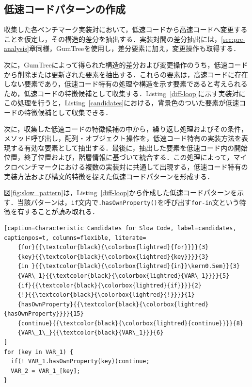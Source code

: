 \documentclass[submit,techrep,noauthor]{ipsj}
\begin{document}
\subsection{低速コードパターンの作成}
収集した各ベンチマーク実装対において，低速コードから高速コードへ変更することを仮定し，その構造的差分を抽出する．実装対間の差分抽出には，\ref{sec:pre-analysis}章同様，GumTreeを使用し，差分要素に加え，変更操作も取得する．

次に，GumTreeによって得られた構造的差分および変更操作のうち，低速コードから削除または更新された要素を抽出する．これらの要素は，高速コードに存在しない要素であり，低速コード特有の処理や構造を示す要素であると考えられるため，低速コードの特徴候補として収集する．Listing~\ref{diff-loop}に示す実装対にこの処理を行うと，Listing~\ref{candidates}における，背景色のついた要素が低速コードの特徴候補として収集できる．

次に，収集した低速コードの特徴候補の中から，繰り返し処理およびその条件，メソッド呼び出し，配列・オブジェクト操作を，低速コード特有の実装方法を表現する有効な要素として抽出する．最後に，抽出した要素を低速コード内の開始位置，終了位置および，階層情報に基づいて統合する．この処理によって，マイクロベンチマークにおける複数の実装対に共通して出現する，低速コード特有の実装方法および構文的特徴を捉えた低速コードパターンを形成する．

図\ref{fig:slow_pattern}は，Listing~\ref{diff-loop}から作成した低速コードパターンを示す．当該パターンは，\texttt{if}文内で\texttt{.hasOwnProperty()}を呼び出す\texttt{for-in}文という特徴を有することが読み取れる．

\begin{lstlisting}[caption=Characteristic Candidates for Slow Code, label=candidates, captionpos=t, columns=flexible, literate=
    {for}{{\textcolor{black}{\colorbox{lightred}{for}}}}{3}
    {key}{{\textcolor{black}{\colorbox{lightred}{key}}}}{3}
    {in }{{\textcolor{black}{\colorbox{lightred}{in}}\kern0.5em}}{3}
    {VAR\_1}{{\textcolor{black}{\colorbox{lightred}{VAR\_1}}}}{5}
    {if}{{\textcolor{black}{\colorbox{lightred}{if}}}}{2}
    {!}{{\textcolor{black}{\colorbox{lightred}{!}}}}{1}
    {hasOwnProperty}{{\textcolor{black}{\colorbox{lightred}{hasOwnProperty}}}}{15}
    {continue}{{\textcolor{black}{\colorbox{lightred}{continue}}}}{8}
    {VAR\_1\_}{{\textcolor{black}{VAR\_1}}}{6}
]
for (key in VAR_1) {
  if(! VAR_1.hasOwnProperty(key))continue;
  VAR_2 = VAR_1_[key];
}
\end{lstlisting}
\end{document}
